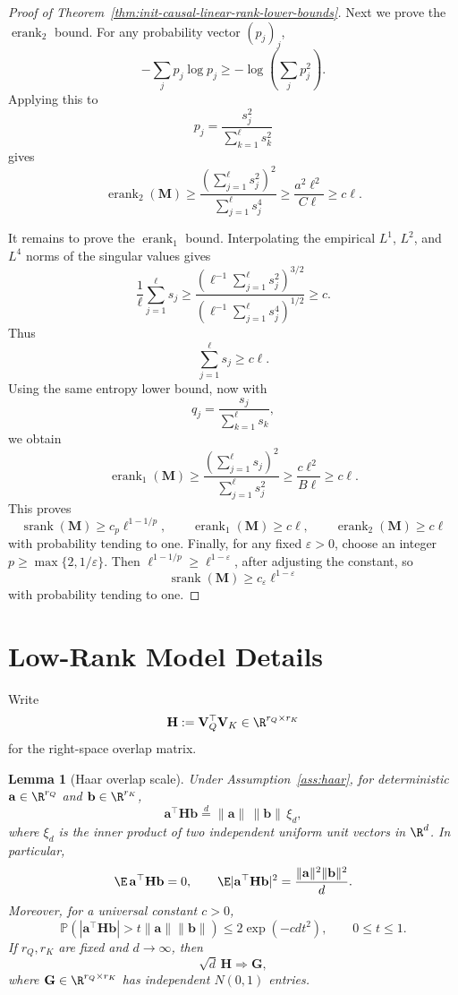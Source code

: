 \documentclass{article}
\newcommand{\Prob}{\mathbb{P}}
\newcommand{\srank}{\operatorname{srank}}
\newcommand{\erank}{\operatorname{erank}}
\newcommand{\weak}{\Rightarrow}
\newcommand{\bM}{\mathbf{M}}
\newcommand{\bV}{\mathbf{V}}
\newcommand{\bG}{\mathbf{G}}
\newcommand{\bH}{\mathbf{H}}
\newtheorem{lemma}[theorem]{Lemma}
\theoremstyle{definition}
\theoremstyle{remark}
\begin{document}
\begin{proof}[Proof of Theorem~\ref{thm:init-causal-linear-rank-lower-bounds}]
Next we prove the $\erank_2$ bound.  For any probability vector
$(p_j)_j$,
\[
    -\sum_j p_j\log p_j
    \geq
    -\log\left(\sum_j p_j^2\right).
\]
Applying this to
\[
    p_j=\frac{s_j^2}{\sum_{k=1}^{\ell}s_k^2}
\]
gives
\[
    \erank_2(\bM)
    \geq
    \frac{\left(\sum_{j=1}^{\ell}s_j^2\right)^2}
    {\sum_{j=1}^{\ell}s_j^4}
    \geq
    \frac{a^2\ell^2}{C\ell}
    \geq
    c\ell.
\]

It remains to prove the $\erank_1$ bound.  Interpolating the empirical
$L^1$, $L^2$, and $L^4$ norms of the singular values gives
\[
    \frac1\ell\sum_{j=1}^{\ell}s_j
    \geq
    \frac{
    \left(\ell^{-1}\sum_{j=1}^{\ell}s_j^2\right)^{3/2}
    }{
    \left(\ell^{-1}\sum_{j=1}^{\ell}s_j^4\right)^{1/2}
    }
    \geq
    c.
\]
Thus
\[
    \sum_{j=1}^{\ell}s_j\geq c\ell.
\]
Using the same entropy lower bound, now with
\[
    q_j=\frac{s_j}{\sum_{k=1}^{\ell}s_k},
\]
we obtain
\[
    \erank_1(\bM)
    \geq
    \frac{\left(\sum_{j=1}^{\ell}s_j\right)^2}
    {\sum_{j=1}^{\ell}s_j^2}
    \geq
    \frac{c\ell^2}{B\ell}
    \geq
    c\ell.
\]
This proves
\[
    \srank(\bM)
    \geq
    c_p\ell^{1-1/p},
    \qquad
    \erank_1(\bM)\geq c\ell,
    \qquad
    \erank_2(\bM)\geq c\ell
\]
with probability tending to one.  Finally, for any fixed $\varepsilon>0$,
choose an integer $p\geq\max\{2,1/\varepsilon\}$.  Then
$\ell^{1-1/p}\geq \ell^{1-\varepsilon}$, after adjusting the constant, so
\[
    \srank(\bM)\geq c_{\varepsilon}\ell^{1-\varepsilon}
\]
with probability tending to one.
\end{proof}

\section{Low-Rank Model Details}

Write
\begin{equation}
    \bH:=\bV_Q^\top\bV_K\in\R^{r_Q\times r_K}
    \label{eq:H}
\end{equation}
for the right-space overlap matrix.

\begin{lemma}[Haar overlap scale]
Under Assumption~\ref{ass:haar}, for deterministic
$\mathbf a\in\R^{r_Q}$ and $\mathbf b\in\R^{r_K}$,
\[
    \mathbf a^\top\bH\mathbf b
    \stackrel{d}{=}
    \|\mathbf a\|\,\|\mathbf b\|\,\xi_d,
\]
where $\xi_d$ is the inner product of two independent uniform unit vectors in
$\R^d$.  In particular,
\[
    \E\,\mathbf a^\top\bH\mathbf b=0,
    \qquad
    \E|\mathbf a^\top\bH\mathbf b|^2
    =
    \frac{\|\mathbf a\|^2\|\mathbf b\|^2}{d}.
\]
Moreover, for a universal constant $c>0$,
\[
    \Prob\left(
    |\mathbf a^\top\bH\mathbf b|
    >
    t\|\mathbf a\|\|\mathbf b\|
    \right)
    \leq 2\exp(-cdt^2),
    \qquad 0\leq t\leq 1.
\]
If $r_Q,r_K$ are fixed and $d\to\infty$, then
\[
        \sqrt d\,\bH\weak \bG,
\]
where $\bG\in\R^{r_Q\times r_K}$ has independent $N(0,1)$ entries.
\label{lem:haar-overlap}
\end{lemma}
\end{document}
